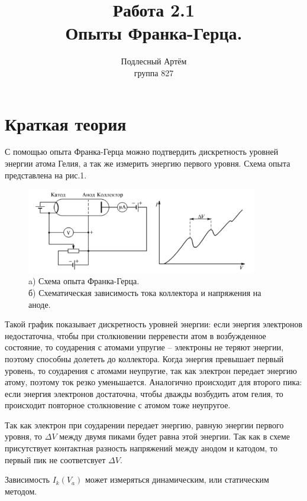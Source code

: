 \documentclass[a4paper, 14pt]{extarticle}%
\author{Подлесный Артём \\ группа 827}
\title{Работа 2.1 \\ Опыты Франка-Герца.}
\newcommand\ECaption[1]{%
     \captionsetup{font=footnotesize}%
     \caption{#1}}
\begin{document}
\maketitle

\section*{Краткая теория}

С помощью опыта Франка-Герца можно подтвердить дискретность уровней энергии атома Гелия, а так же измерить энергию первого уровня. Схема опыта представлена на рис.1.

\begin{figure}[h]
\begin{center}
\includegraphics[width=0.9\textwidth]{teor1}
\ECaption{a) Схема опыта Франка-Герца. \\ б) Схематическая зависимость тока коллектора и напряжения на аноде.}
\end{center}
\end{figure}

Такой график показывает дискретность уровней энергии: если энергия электронов недостаточна, чтобы при столкновении перревести атом в возбужденное состояние, то соударения с атомами упругие -- электроны не теряют энергии, поэтому способны долететь до коллектора. Когда энергия превышает первый уровень, то соударения с атомами неупругие, так как электрон передает энергию атому, поэтому ток резко уменьшается. Аналогично происходит для второго пика: если энергия электронов достаточна, чтобы дважды возбудить атом гелия, то происходит повторное столкновение с атомом тоже неупругое. 

Так как электрон при соударении передает энергию, равную энергии первого уровня, то $\Delta V$ между двумя пиками будет равна этой энергии. Так как в схеме присутствует контактная разность напряжений между анодом и катодом, то первый пик не соответсвует $\Delta V$.

Зависимость $I_k(V_a)$ может измеряться динамическим, или статическим методом.
\end{document}
